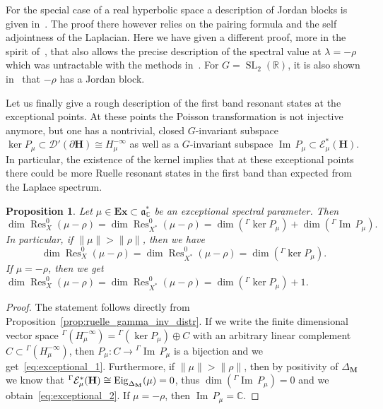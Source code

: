 \documentclass[10pt]{amsart}
\newtheorem{prop}[cdrthm]{Proposition}
\theoremstyle{definition}
\DeclareMathOperator{\SL}{SL}
\DeclareMathOperator{\Res}{Res}
\DeclareMathOperator{\Eig}{Eig}
\DeclareMathOperator{\Imag}{Im}
\newcommand{\rr}{\mathbb{R}}
\newcommand{\cc}{\mathbb{C}}
\newcommand{\bfh}{\mathbf{H}}
\newcommand{\bfm}{\mathbf{M}}
\newcommand{\pl}{\partial}
\renewcommand{\a}{\mathfrak a}
\begin{document}
For the special case of a real hyperbolic space a description of Jordan blocks is given in~\cite{DFG15}. The proof there however relies on the pairing formula and the self adjointness of the Laplacian. Here we have given a different proof, more in the spirit of~\cite{GHW18}, that also allows the precise description of the spectral value at $\lambda=-\rho$ which was untractable with the methods in~\cite{DFG15}. For $G={\SL}_2(\rr)$, it is also shown in~\cite{Co05,FF03} that $-\rho$ has a Jordan block.


Let us finally give a rough description of the first band resonant states at the exceptional points. At these points the Poisson transformation is not injective anymore, but one has a nontrivial, closed $G$-invariant subspace $\ker P_\mu \subset \mathcal D'(\pl {\bfh})\cong H_\mu^{-\infty}$ as well as a $G$-invariant subspace ${\Imag}\, P_\mu \subset \mathcal E_\mu^*({\bfh})$. In particular, the existence of the kernel implies that at these exceptional points there could be more Ruelle resonant states in the first band than expected from the Laplace spectrum.

\begin{prop}
Let $\mu\in \mathbf{Ex}\subset \a^*_\cc$ be an exceptional spectral parameter. Then
\begin{equation}\label{eq:exceptional_1}
\dim \Res^0_{X}(\mu-\rho) = \dim \Res^0_{X^*}(\mu-\rho) = \dim (^\Gamma\ker P_\mu) + \dim (^\Gamma{\Imag}\,P_\mu).
\end{equation}
In particular, if $\|\mu\| > \|\rho\|$, then we have
\begin{equation}\label{eq:exceptional_2}
\dim \Res^0_{X}(\mu-\rho) = \dim \Res^0_{X^*}(\mu-\rho) = \dim (^\Gamma\ker P_\mu).
\end{equation}
If $\mu=-\rho$, then we get $ \dim \Res^0_{X}(\mu-\rho) = \dim \Res^0_{X^*}(\mu-\rho) = \dim (^\Gamma\ker P_\mu)+1$.
\end{prop}

\begin{proof}
The statement follows directly from Proposition~\ref{prop:ruelle_gamma_inv_distr}. If we write the finite dimensional vector space $^\Gamma(H^{-\infty}_{\mu}) = {^\Gamma(\ker P_\mu)}\oplus C$ with an arbitrary linear complement $C\subset{} ^\Gamma(H^{-\infty}_{\mu})$, then $P_\mu: C\to{^\Gamma {\Imag}\,P_\mu}$ is a bijection and we get~\eqref{eq:exceptional_1}. Furthermore, if $\|\mu\| > \|\rho\|$, then by positivity of $\Delta_{\bfm}$ we know that $^\Gamma \mathcal E^*_\mu({\bfh})\linebreak\cong \Eig_{\Delta_{\bfm}}(\mu) = 0$, thus $\dim (^\Gamma {\Imag}\,P_\mu)=0$ and we obtain~\eqref{eq:exceptional_2}. If $\mu=-\rho$, then ${\Imag}\,P_\mu=\cc$.
\end{proof}
\end{document}

